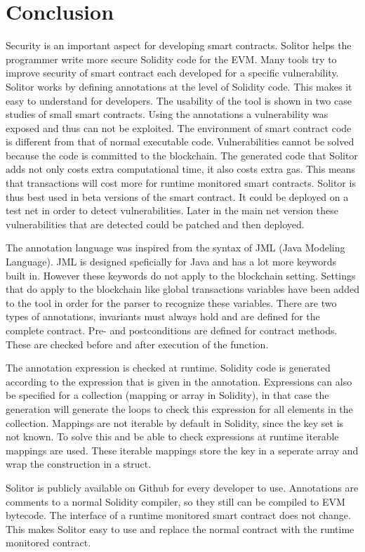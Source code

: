 \documentclass[a4paper]{article}
\begin{document}
\newpage
\section{Conclusion}
\label{sec:conclusion}
Security is an important aspect for developing smart contracts. Solitor helps the programmer write more secure Solidity code for the EVM. Many tools try to improve security of smart contract each developed for a specific vulnerability. Solitor works by defining annotations at the level of Solidity code. This makes it easy to understand for developers. The usability of the tool is shown in two case studies of small smart contracts. Using the annotations a vulnerability was exposed and thus can not be exploited. The environment of smart contract code is different from that of normal executable code. Vulnerabilities cannot be solved because the code is committed to the blockchain. The generated code that Solitor adds not only costs extra computational time, it also costs extra gas. This means that transactions will cost more for runtime monitored smart contracts. Solitor is thus best used in beta versions of the smart contract. It could be deployed on a test net in order to detect vulnerabilities. Later in the main net version these vulnerabilities that are detected could be patched and then deployed. \par
The annotation language was inspired from the syntax of JML (Java Modeling Language). JML is designed speficially for Java and has a lot more keywords built in. However these keywords do not apply to the blockchain setting. Settings that do apply to the blockchain like global transactions variables have been added to the tool in order for the parser to recognize these variables. There are two types of annotations, invariants must always hold and are defined for the complete contract. Pre- and postconditions are defined for contract methods. These are checked before and after execution of the function. \par
The annotation expression is checked at runtime. Solidity code is generated according to the expression that is given in the annotation. Expressions can also be specified for a collection (mapping or array in Solidity), in that case the generation will generate the loops to check this expression for all elements in the collection. Mappings are not iterable by default in Solidity, since the key set is not known. To solve this and be able to check expressions at runtime iterable mappings are used. These iterable mappings store the key in a seperate array and wrap the construction in a struct. \par
Solitor is publicly available on Github for every developer to use. Annotations are comments to a normal Solidity compiler, so they still can be compiled to EVM bytecode. The interface of a runtime monitored smart contract does not change. This makes Solitor easy to use and replace the normal contract with the runtime monitored contract. 
\end{document}
